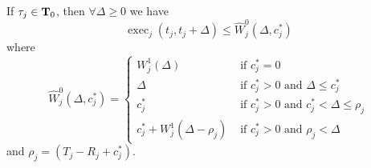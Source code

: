 \begin{Lemma}
\label{lemma:Wj0-exact}
If $\tau_j \in {\bf T}_0$, then $\forall \Delta \geq 0$ we have 
\[
\operatorname{exec}_j(t_j, t_j+\Delta) \leq \widehat{W}_j^0(\Delta, c_j^*) 
\]
where 
{\footnotesize \begin{equation}
    \label{eq:execution-case2-precise}
    \widehat{W}_j^0(\Delta, c_j^*)=
    \begin{cases}
      W_j^1(\Delta) & \mbox{ if } c_j^* = 0\\
      \Delta & \mbox{ if } c_j^* > 0 \mbox{ and } \Delta \leq  c_j^*\\
      c_j^* & \mbox{ if } c_j^* > 0 \mbox{ and } c_j^* < \Delta \leq  \rho_j\\
      c_j^* + W_j^1(\Delta-\rho_j) & \mbox{ if } c_j^* > 0 \mbox{ and } \rho_j < \Delta
    \end{cases}
  \end{equation}}
  and
  $\rho_j = (T_j-R_j +  c_j^*)$.
\end{Lemma}
